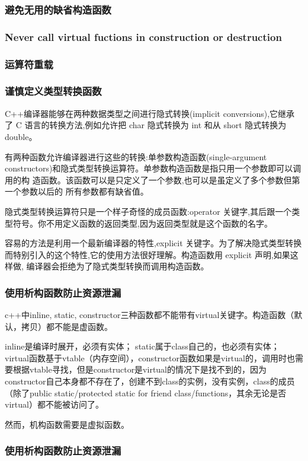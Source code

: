 \subsubsection{避免无用的缺省构造函数}
\subsubsection{Never call virtual fuctions in construction or destruction}
\subsubsection{运算符重载}
\subsubsection{谨慎定义类型转换函数}
C++编译器能够在两种数据类型之间进行隐式转换(implicit conversions),它继承 了 C 语言的转换方法,例如允许把 char 隐式转换为 int 和从 short 隐式转换为 double。

有两种函数允许编译器进行这些的转换:单参数构造函数(single-argument constructors)和隐式类型转换运算符。单参数构造函数是指只用一个参数即可以调用的构 造函数。该函数可以是只定义了一个参数,也可以是虽定义了多个参数但第一个参数以后的 所有参数都有缺省值。

隐式类型转换运算符只是一个样子奇怪的成员函数:operator 关键字,其后跟一个类
型符号。你不用定义函数的返回类型,因为返回类型就是这个函数的名字。

容易的方法是利用一个最新编译器的特性,explicit 关键字。为了解决隐式类型转换 而特别引入的这个特性,它的使用方法很好理解。构造函数用 explicit 声明,如果这样做, 编译器会拒绝为了隐式类型转换而调用构造函数。

\subsubsection{使用析构函数防止资源泄漏}
c++中inline, static, constructor三种函数都不能带有virtual关键字。构造函数（默认，拷贝）都不能是虚函数。

inline是编译时展开，必须有实体；
static属于class自己的，也必须有实体；
virtual函数基于vtable（内存空间），constructor函数如果是virtual的，调用时也需要根据vtable寻找，但是constructor是virtual的情况下是找不到的，因为constructor自己本身都不存在了，创建不到class的实例，没有实例，class的成员（除了public static/protected static for friend class/functions，其余无论是否virtual）都不能被访问了。

然而，机构函数需要是虚拟函数。

\subsubsection{使用析构函数防止资源泄漏}
